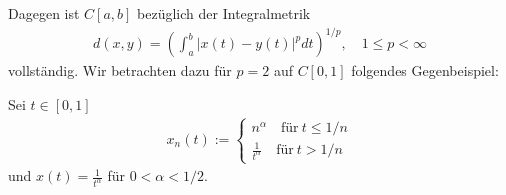 \documentclass[letterpaper,10pt,english]{jupyterBook}
\begin{document}
Dagegen ist \(C[a,b]\) bezüglich der Integralmetrik
\begin{equation}\label{equation:Funktionalanalysis/Funktionalanalysis:eq:LpMetrik}
\begin{split}d(x,y) = \left(\int_a^b |x(t)-y(t)|^p dt \right)^{1/p},\quad 1\le p < \infty\end{split}
\end{equation}
 vollständig. Wir betrachten dazu für \(p=2\) auf \(C[0,1]\) folgendes Gegenbeispiel:

Sei \(t\in[0,1]\)
\begin{equation}\label{equation:Funktionalanalysis/Funktionalanalysis:eq:Gegenbeispiel}
\begin{split}x_n(t) := \begin{cases}
n^\alpha\quad\text{für}\ t \le 1/n\\
\frac{1}{t^\alpha}\quad\text{für}\ t > 1/n\end{cases}\end{split}
\end{equation}
und \(x(t) = \frac{1}{t^\alpha}\) für \(0<\alpha<1/2\).

\noindent{}
\end{document}

